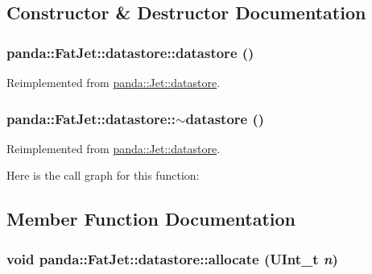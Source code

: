 \subsection{Constructor \& Destructor Documentation}
\hypertarget{structpanda_1_1FatJet_1_1datastore_a9705a085f7cb1355b03cbfff4f580dbf}{
\subsubsection[{datastore}]{\setlength{\rightskip}{0pt plus 5cm}panda::FatJet::datastore::datastore ()}}
\label{structpanda_1_1FatJet_1_1datastore_a9705a085f7cb1355b03cbfff4f580dbf}


Reimplemented from \hyperlink{structpanda_1_1Jet_1_1datastore_ae927a2e58d5ac6418b839d01dac0bd37}{panda::Jet::datastore}.\hypertarget{structpanda_1_1FatJet_1_1datastore_ab30c9e78310606976935325a55cb10e6}{
\subsubsection[{$\sim$datastore}]{\setlength{\rightskip}{0pt plus 5cm}panda::FatJet::datastore::$\sim$datastore ()}}
\label{structpanda_1_1FatJet_1_1datastore_ab30c9e78310606976935325a55cb10e6}


Reimplemented from \hyperlink{structpanda_1_1Jet_1_1datastore_a70fb643b535f39f676287fe34d603e01}{panda::Jet::datastore}.

Here is the call graph for this function:

\subsection{Member Function Documentation}
\hypertarget{structpanda_1_1FatJet_1_1datastore_a5df5d3f7ed3b3d1d70f99dcb6a9c25e4}{
\subsubsection[{allocate}]{\setlength{\rightskip}{0pt plus 5cm}void panda::FatJet::datastore::allocate (UInt\_\-t {\em n})}}
\label{structpanda_1_1FatJet_1_1datastore_a5df5d3f7ed3b3d1d70f99dcb6a9c25e4}


